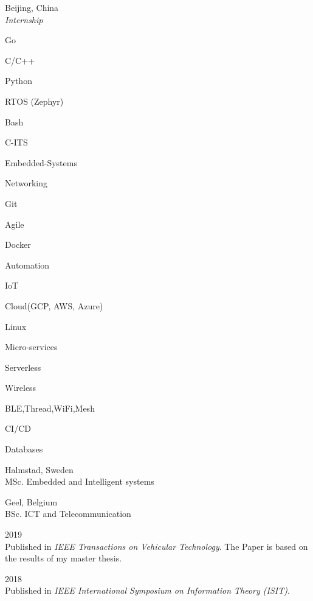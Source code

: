 \documentclass[a4paper,12pt,final]{memoir}
\begin{document}
 \hfill Beijing, China \\
\emph{Internship}
\Sep


	
\begin{multicols}{3}
\begin{compactitem}[\color{RoyalBlue}$\circ$]
	\item Go
	\item C/C++ 
	\item Python
	\item RTOS (Zephyr) 
	\item Bash
	\item C-ITS
	\item Embedded-Systems
	\item Networking
	\item Git
	\item Agile 
	\item Docker
	\item Automation
	\item IoT
	\item Cloud(GCP, AWS, Azure)
	\item Linux
	\item Micro-services
	\item Serverless
	\item Wireless
	\item BLE,Thread,WiFi,Mesh
	\item CI/CD
	\item Databases
\end{compactitem}
\end{multicols}

\Sep

 \hfill Halmstad, Sweden \\
MSc. Embedded and Intelligent systems
\SmallSep

 \hfill Geel, Belgium \\
BSc. ICT and Telecommunication
\Sep

 \hfill 2019 \\
Published in \emph{IEEE Transactions on Vehicular Technology}. The Paper is based on the results of my master thesis.
\SmallSep

 \hfill 2018 \\
Published in \emph{IEEE International Symposium on Information Theory (ISIT)}.
\Sep

\end{document}
